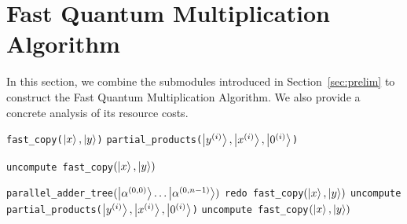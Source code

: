 \documentclass[reprint,amsmath,amssymb,aps,pra]{revtex4-2}
\begin{document}

\section{Fast Quantum Multiplication Algorithm}

In this section, we combine the submodules introduced in Section~\ref{sec:prelim} to construct the Fast Quantum Multiplication Algorithm. We also provide a concrete analysis of its resource costs.

\begin{algorithm}[H]
\caption{fast\_quantum\_multiplication\_algorithm}
\label{algo:multiplication}

\vspace{0.5em}
\texttt{fast\_copy($\ket{x},\ket{y}$)}\;
\vspace{0.5em}
\texttt{partial\_products($\ket{y^{(i)}}, \ket{x^{(i)}},\ket{0^{(i)}}$)}\;

\vspace{0.5em}
\texttt{uncompute fast\_copy$(\ket{x}, \ket{y})$}\;
\vspace{0.5em}

\texttt{parallel\_adder\_tree$(\ket{\alpha^{(0,0)}}\dots\ket{\alpha^{(0,n-1)}})$}\;
\vspace{0.5em}
\texttt{redo fast\_copy$(\ket{x},\ket{y})$}\;
\vspace{0.5em}
\texttt{uncompute partial\_products($\ket{y^{(i)}}, \ket{x^{(i)}},\ket{0^{(i)}}$)}\;
\vspace{0.5em}
\texttt{uncompute fast\_copy$(\ket{x}, \ket{y})$}\;
\vspace{0.5em}

\end{algorithm}
\end{document}
